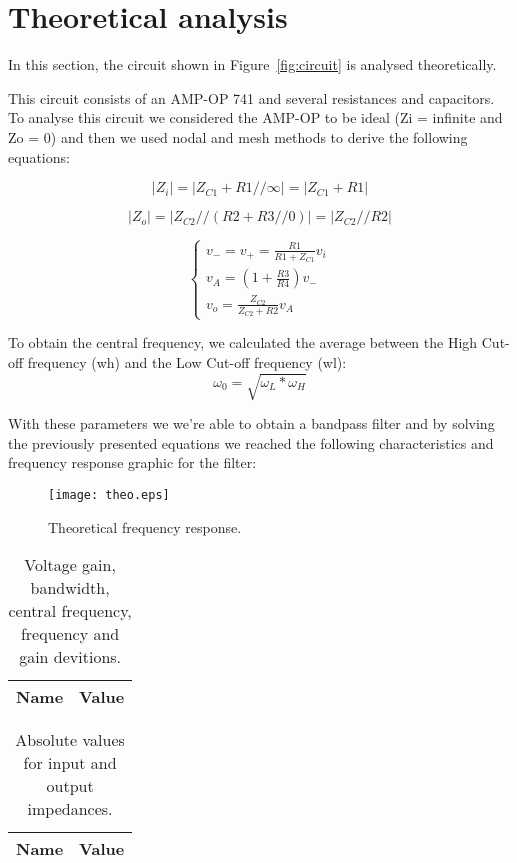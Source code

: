 \section{Theoretical analysis}

\label{sec:analysis}

\tab In this section, the circuit shown in Figure~\ref{fig:circuit} is analysed theoretically.

This circuit consists of an AMP-OP 741 and several resistances and capacitors. To analyse this circuit we considered the AMP-OP to be ideal (Zi = infinite and Zo = 0) and then we used nodal and mesh methods to derive the following equations:

\begin{equation}
\left|Z_{i}\right|=\left|Z_{C 1}+R 1 / / \infty\right|=\left|Z_{C 1}+R 1\right|
\end{equation}

\begin{equation}
\left|Z_{o}\right|=\left|Z_{C 2} / /(R 2+R 3 / / 0)\right|=\left|Z_{C 2} / / R 2\right|
\end{equation}

\begin{equation}
\left\{\begin{array}{l}
v_{-}=v_{+}=\frac{R 1}{R 1+Z_{C 1}} v_{i} \\
v_{A}=\left(1+\frac{R 3}{R 4}\right) v_{-} \\
v_{o}=\frac{Z_{C 2}}{Z_{C 2}+R 2} v_{A}
\end{array}\right.
\end{equation}

To obtain the central frequency, we calculated the average between the High Cut-off frequency (wh) and the Low Cut-off frequency (wl):
\begin{equation}
\omega_{0}=\sqrt{\omega_{L} * \omega_{H}}
\end{equation}

With these parameters we we're able to obtain a bandpass filter and by solving the previously presented equations we reached the following characteristics and frequency response graphic for the filter:


\begin{figure}[H] \centering
    \texttt{[image: theo.eps]}
    \caption{Theoretical frequency response.}
    \label{fig:theo1}
\end{figure}

\begin{table}[H]
    \centering
    \begin{tabular}{|l|r|}
    \hline
    {\bf Name} & {\bf Value} \\ \hline
   
    \end{tabular}
    \caption{Voltage gain, bandwidth, central frequency, frequency and gain devitions.}
    \label{tab:theo1}
\end{table}


\begin{table}[H]
    \centering
    \begin{tabular}{|l|r|}
    \hline
    {\bf Name} & {\bf Value} \\ \hline
   
    \end{tabular}
    \caption{Absolute values for input and output impedances.}
    \label{tab:theo2}
\end{table}
